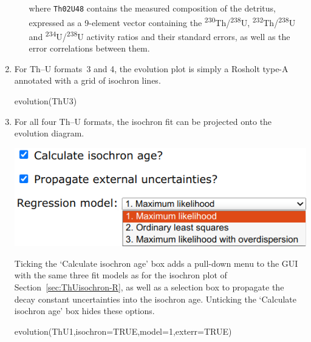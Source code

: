 \begin{refsection}
\begin{enumerate}
\begin{enumerate}
\noindent where \texttt{Th02U48} contains the measured composition of
the detritus, expressed as a 9-element vector containing the
\textsuperscript{230}Th/\textsuperscript{238}U,
\textsuperscript{232}Th/\textsuperscript{238}U and
\textsuperscript{234}U/\textsuperscript{238}U activity ratios and
their standard errors, as well as the error correlations between them.

\end{enumerate}

\item For Th--U formats~3 and 4, the evolution plot is simply a
  Rosholt type-A annotated with a grid of isochron lines.

\begin{console}
evolution(ThU3)
\end{console}

\item For all four Th--U formats, the isochron fit can be projected
  onto the evolution diagram.\\

  \begin{minipage}[t]{.55\linewidth}
    \strut\vspace*{-\baselineskip}\newline
    \includegraphics[width=\linewidth]{../figures/ThUevolutionIsochron.png}
  \end{minipage}
  \begin{minipage}[t]{.45\linewidth}
    Ticking the `Calculate isochron age' box adds a pull-down menu
    to the GUI with the same three fit models as for the isochron
    plot of Section~\ref{sec:ThUisochron-R}, as well as a selection
    box to propagate the decay constant uncertainties into the
    isochron age. Unticking the `Calculate isochron age' box hides
    these options.
  \end{minipage}

\begin{console}
evolution(ThU1,isochron=TRUE,model=1,exterr=TRUE)
\end{console}


\end{enumerate}
\end{refsection}
